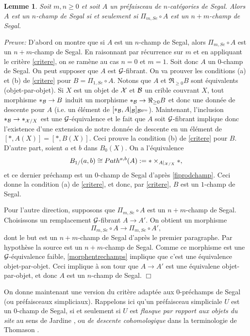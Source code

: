 \documentclass[12pt]{article}
\newcommand{\eop}{\hfill $\Box$\vspace{.1in}}
\newtheorem{lemme}[lemma]{Lemme}
\newcommand{\Gg}{{\cal G}}
\newcommand{\Bb}{{\cal B}}
\newcommand{\Xx}{{\cal X}}
\begin{document}
\begin{lemme}
\label{pimseg}
Soit $m,n\geq 0$ et soit $A$ un pr\'efaisceau de $n$-cat\'egories de Segal.
Alors $A$ est un $n$-champ de Segal si et seulement si $\Pi _{m,Se}\circ A$ est
un $n+m$-champ de Segal.
\end{lemme}
{\em Preuve:}
D'abord on montre que si $A$ est un $n$-champ de Segal, alors
$\Pi _{m,Se}\circ A$ est un $n+m$-champ de Segal. En raisonnant par r\'ecurrence
sur $m$ et en appliquant le crit\`ere \ref{critere}, on se ram\`ene
au cas $n=0$ et $m=1$. Soit donc $A$ un $0$-champ de Segal. On peut
supposer que $A$ est $\Gg$-fibrant. On va prouver les conditions
(a) et (b) de \ref{critere}
pour $B=\Pi _{1,Se}\circ A$. Notons que $A$ et $\Re _{\geq 0}B$ sont
\'equivalents
(objet-par-objet). Si $X$ est un objet de
$\Xx$ et $\Bb$ un crible
couvrant $X$, tout morphisme $\ast _{\Bb}\rightarrow B$ induit
un morphisme $\ast
_{\Bb}\rightarrow \Re _{\geq 0}B$ et donc une donn\'ee de descente pour $A$
(i.e. un \'el\'ement de $[\ast _{\Bb}, A|_{\Bb }]_{\Bb ^{\rm gro}}$).
Maintenant,
l'inclusion $\ast _{\Bb}\rightarrow \ast _{\Xx /X}$ est une $\Gg$-\'equivalence
et le fait que $A$ soit $\Gg$-fibrant implique donc l'existence d'une extension
de notre donn\'ee de descente en un \'el\'ement de $[\ast , A(X)]= [\ast ,
B(X)]$. Ceci prouve
la condition (b) de \ref{critere} pour $B$. D'autre part, soient
$a$ et $b$ dans $B_0(X)$. On a l'\'equivalence
$$
B_{1/}(a,b) \cong Path ^{a,b}(A):= \ast \times _{A|_{\Xx /X}}\ast ,
$$
et ce
dernier pr\'echamp
est un $0$-champ de Segal d'apr\`es \ref{fiprodchamp}. Ceci donne
la condition (a) de
\ref{critere}, et donc, par \ref{critere}, $B$ est un $1$-champ de Segal.

Pour l'autre direction, supposons que
$\Pi _{m,Se}\circ A$ est un $n+m$-champ de Segal.
Choisissons un remplacement $\Gg$-fibrant
$A\rightarrow A'$. On obtient un morphisme
$$
\Pi _{m,Se}\circ A\rightarrow \Pi _{m,Se}\circ A',
$$
dont le but est un $n+m$-champ de Segal d'apr\`es le premier paragraphe.
Par hypoth\`ese la source est un $n+m$-champ de Segal. Comme ce morphisme est
une $\Gg$-\'equivalence faible, \ref{morphentrechamps} implique que c'est
une \'equivalence objet-par-objet. Ceci implique \`a son tour que $A\rightarrow
A'$ est une \'equivalene objet-par-objet, et donc $A$ est un $n$-champ de Segal.
\eop


On donne maintenant une version du crit\`ere adapt\'ee aux
$0$-pr\'echamps de Segal
(ou pr\'efaisceaux simpliciaux). Rappelons ici qu'un pr\'efaisceau
simpliciale $U$
est un $0$-champ de Segal, si et seulement si $U$ est {\em flasque par rapport
aux objets du site} au sens de Jardine \cite{Jardine}, ou {\em de
descente cohomologique} dans la terminologie de Thomason
\cite{Thomason} \cite{TravauxThomason}.
\end{document}
